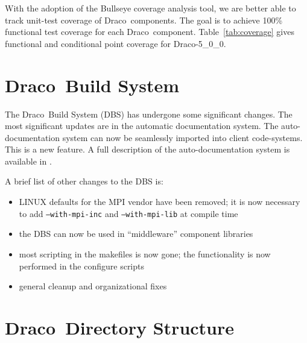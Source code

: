 \documentclass[note]{ResearchNote}
\newcommand{\draco}{Draco}
\newcommand{\dracor}{\draco-5\_0\_0}
\begin{document}
With the adoption of the \textsf{Bullseye} coverage analysis tool, we
are better able to track unit-test coverage of \draco\ components.
The goal is to achieve 100\% functional test coverage for each \draco\
component.  Table~\ref{tab:coverage} gives functional and conditional
point coverage for \dracor.



\section{\draco\ Build System}
\label{sec:dbs}

The \draco\ Build System (DBS) has undergone some significant
changes.  The most significant updates are in the automatic
documentation system.  The auto-documentation system can now be
seamlessly imported into client code-systems.  This is a new feature.
A full description of the auto-documentation system is available in
\cite{ccs-4:04-35}. 

A brief list of other changes to the DBS is:
\begin{itemize}
\item LINUX defaults for the MPI vendor have been removed; it is now
  necessary to add \texttt{--with-mpi-inc} and \texttt{--with-mpi-lib}
  at compile time
\item the DBS can now be used in ``middleware'' component libraries
\item most scripting in the makefiles is now gone; the functionality
  is now performed in the configure scripts
\item general cleanup and organizational fixes
\end{itemize}


\section{\draco\ Directory Structure}
\end{document}
